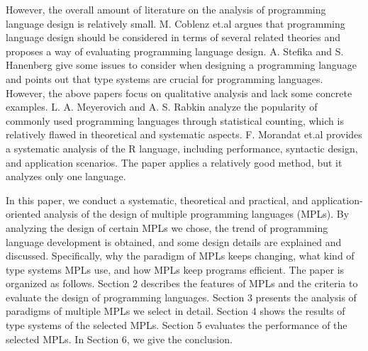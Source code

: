 However, the overall amount of literature on the analysis of
programming language design is relatively small.
M. Coblenz et.al argues that programming language design should be considered in terms
of several related theories and proposes a way of evaluating programming
language design\cite{coblenz2018interdisciplinary}.
A. Stefika and S. Hanenberg give some issues to consider when designing
a programming language and points out that type systems are crucial for
programming languages\cite{stefik2014programming}.
However, the above papers focus on qualitative analysis and lack
some concrete examples.
L. A. Meyerovich and A. S. Rabkin analyze the popularity of commonly
used programming languages through statistical counting,
which is relatively flawed in theoretical and systematic aspects\cite{meyerovich2013empirical}.
F. Morandat et.al provides a systematic analysis of the R language,
including performance, syntactic design, and application scenarios\cite{morandat2012evaluating}.
The paper applies a relatively good method, but it analyzes only one language.

In this paper, we conduct a systematic, theoretical and practical,
and application-oriented analysis of the design of multiple programming
languages (MPLs).
By analyzing the design of certain MPLs we chose, the trend of programming
language development is obtained,
and some design details are explained and discussed.
Specifically, why the paradigm of MPLs keeps changing,
what kind of type systems MPLs use, and how MPLs keep programs efficient.
The paper is organized as follows.
Section 2 describes the features of MPLs and the criteria to evaluate the design of programming languages.
Section 3 presents the analysis of paradigms of multiple MPLs we select in detail.
Section 4 shows the results of type systems of the selected MPLs.
Section 5 evaluates the performance of the selected MPLs.
In Section 6, we give the conclusion.

